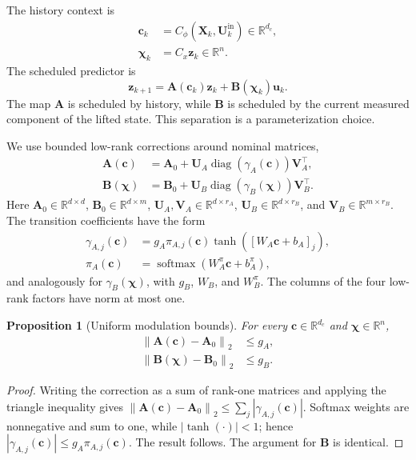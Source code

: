 \documentclass[journal]{IEEEtran}
\newtheorem{proposition}{Proposition}
\newcommand{\vu}{\mathbf{u}}
\newcommand{\vz}{\mathbf{z}}
\newcommand{\vc}{\mathbf{c}}
\newcommand{\vchi}{\boldsymbol{\chi}}
\newcommand{\mA}{\mathbf{A}}
\newcommand{\mB}{\mathbf{B}}
\newcommand{\mU}{\mathbf{U}}
\newcommand{\mV}{\mathbf{V}}
\newcommand{\mX}{\mathbf{X}}
\newcommand{\R}{\mathbb{R}}
\newcommand{\norm}[1]{\left\lVert #1\right\rVert}
\begin{document}
The history context is
\begin{align}
    \vc_k&=C_\phi(\mX_k,\mU_k^{\mathrm{in}})\in\R^{d_c},
    \label{eq:history_context}\\
    \vchi_k&=C_x\vz_k\in\R^n.
    \label{eq:scheduling_variables}
\end{align}
The scheduled predictor is
\begin{equation}
    \vz_{k+1}=\mA(\vc_k)\vz_k+\mB(\vchi_k)\vu_k.
    \label{eq:scheduled_predictor}
\end{equation}
The map $\mA$ is scheduled by history, while $\mB$ is scheduled by the current measured component of the lifted state. This separation is a parameterization choice.

We use bounded low-rank corrections around nominal matrices,
\begin{align}
    \mA(\vc)&=\mA_0+\mU_A\operatorname{diag}(\gamma_A(\vc))\mV_A^\top,
    \label{eq:transition_schedule}\\
    \mB(\vchi)&=\mB_0+\mU_B\operatorname{diag}(\gamma_B(\vchi))\mV_B^\top.
    \label{eq:low_rank_schedules}
\end{align}
Here $\mA_0\in\R^{d\times d}$, $\mB_0\in\R^{d\times m}$, $\mU_A,\mV_A\in\R^{d\times r_A}$, $\mU_B\in\R^{d\times r_B}$, and $\mV_B\in\R^{m\times r_B}$. The transition coefficients have the form
\begin{align}
    \gamma_{A,j}(\vc)&=g_A\pi_{A,j}(\vc)\tanh([W_A\vc+b_A]_j),
    \label{eq:A_modulation_coefficients}\\
    \pi_A(\vc)&=\operatorname{softmax}(W_A^\pi\vc+b_A^\pi),
    \label{eq:A_modulation}
\end{align}
and analogously for $\gamma_B(\vchi)$, with $g_B$, $W_B$, and $W_B^\pi$. The columns of the four low-rank factors have norm at most one.

\begin{proposition}[Uniform modulation bounds]
\label{prop:modulation_bound}
For every $\vc\in\R^{d_c}$ and $\vchi\in\R^n$,
\begin{equation}
    \begin{aligned}
    \norm{\mA(\vc)-\mA_0}_2&\le g_A,\\
    \norm{\mB(\vchi)-\mB_0}_2&\le g_B.
    \end{aligned}
    \label{eq:modulation_bound}
\end{equation}
\end{proposition}
\begin{proof}
Writing the correction as a sum of rank-one matrices and applying the triangle inequality gives
$\norm{\mA(\vc)-\mA_0}_2\le\sum_j|\gamma_{A,j}(\vc)|$. Softmax weights are nonnegative and sum to one, while $|\tanh(\cdot)|<1$; hence $|\gamma_{A,j}(\vc)|\le g_A\pi_{A,j}(\vc)$. The result follows. The argument for $\mB$ is identical.
\end{proof}
\end{document}
